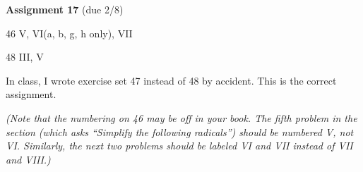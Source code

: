 \documentclass[12pt]{letter}
\begin{document}
\textbf{Assignment 17} (due 2/8)


46 V,  VI(a, b, g, h only),  VII

48 III, V


In class, I wrote exercise set 47 instead of 48 by accident. This is the correct assignment.

{\itshape (Note that the numbering on 46 may be off in your book. The fifth
problem in the section (which asks ``Simplify the following radicals'')
should be numbered V, not VI. Similarly, the next two problems should be
labeled VI and VII instead of VII and VIII.)}
\end{document}
